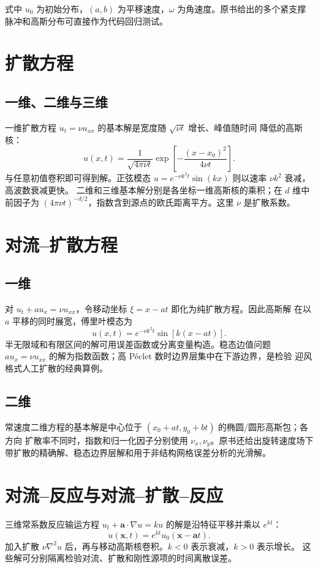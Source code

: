 \documentclass[11pt,a4paper,openany,fontset=none]{ctexbook}
\begin{document}
式中 $u_0$ 为初始分布，$(a,b)$ 为平移速度，$\omega$ 为角速度。原书给出的多个紧支撑
脉冲和高斯分布可直接作为代码回归测试。

\section{扩散方程}
\subsection{一维、二维与三维}
一维扩散方程 $u_t=\nu u_{xx}$ 的基本解是宽度随 $\sqrt{\nu t}$ 增长、峰值随时间
降低的高斯核：
\begin{equation}
 u(x,t)=\frac{1}{\sqrt{4\pi\nu t}}
 \exp\!\left[-\frac{(x-x_0)^2}{4\nu t}\right].
\end{equation}
与任意初值卷积即可得到解。正弦模态
$u=e^{-\nu k^2t}\sin(kx)$ 则以速率 $\nu k^2$ 衰减，高波数衰减更快。
二维和三维基本解分别是各坐标一维高斯核的乘积；在 $d$ 维中前因子为
$(4\pi\nu t)^{-d/2}$，指数含到源点的欧氏距离平方。这里 $\nu$ 是扩散系数。

\section{对流--扩散方程}
\subsection{一维}
对 $u_t+a u_x=\nu u_{xx}$，令移动坐标 $\xi=x-at$ 即化为纯扩散方程。因此高斯解
在以 $a$ 平移的同时展宽，傅里叶模态为
\begin{equation}u(x,t)=e^{-\nu k^2t}\sin[k(x-at)].\end{equation}
半无限域和有限区间的解可用误差函数或分离变量构造。稳态边值问题
$a u_x=\nu u_{xx}$ 的解为指数函数；高 P\'eclet 数时边界层集中在下游边界，是检验
迎风格式人工扩散的经典算例。

\subsection{二维}
常速度二维方程的基本解是中心位于 $(x_0+at,y_0+bt)$ 的椭圆/圆形高斯包；各方向
扩散率不同时，指数和归一化因子分别使用 $\nu_x,\nu_y$。原书还给出旋转速度场下
带扩散的精确解、稳态边界层解和用于非结构网格误差分析的光滑解。

\section{对流--反应与对流--扩散--反应}
三维常系数反应输运方程
$u_t+\bm a\cdot\nabla u=ku$ 的解是沿特征平移并乘以 $e^{kt}$：
\begin{equation}u(\bm x,t)=e^{kt}u_0(\bm x-\bm a t).
\end{equation}
加入扩散 $\nu\nabla^2u$ 后，再与移动高斯核卷积。$k<0$ 表示衰减，$k>0$ 表示增长。
这些解可分别隔离检验对流、扩散和刚性源项的时间离散误差。
\end{document}

